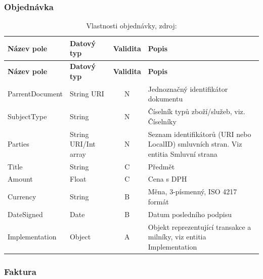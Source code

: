 \subsubsection*{Objednávka}

\begin{center}
\begin{longtable}{lp{20mm}cp{65mm}}
\label{grid_mlmmh} \\
\multicolumn{1}{l}{\textbf{Název pole}} & 
\multicolumn{1}{l}{\textbf{Datový typ}} & 
\multicolumn{1}{l}{\textbf{Validita}} & 
\multicolumn{1}{l}{\textbf{Popis}} \\ \hline 
\endfirsthead
\multicolumn{1}{l}{\textbf{Název pole}} & 
\multicolumn{1}{l}{\textbf{Datový typ}} & 
\multicolumn{1}{l}{\textbf{Validita}} & 
\multicolumn{1}{l}{\textbf{Popis}} \\ \hline 
\hline
\endhead
\endfoot
\caption{Vlastnosti objednávky, zdroj:\protect\cite{metodika}}
\endlastfoot
ParrentDocument & String URI & N & Jednoznačný identifikátor dokumentu \\
SubjectType & String & N & Číselník typů zboží/služeb, viz. Číselníky \\
Parties & String URI/Int array & N & Seznam identifikátorů (URI nebo LocalID) smluvních stran. Viz entitia Smluvní strana \\
\rowcolor{validateC}Title & String & C & Předmět \\
\rowcolor{validateC}Amount & Float & C & Cena s DPH \\
\rowcolor{validateB}Currency & String & B & Měna, 3-písmenný, ISO 4217 formát \\
\rowcolor{validateB}DateSigned & Date & B & Datum posledního podpisu \\
\rowcolor{validateA}Implementation & Object & A & Objekt reprezentující transakce a milníky, viz entitia Implementation \\
\end{longtable}
\end{center}

\subsubsection*{Faktura}

